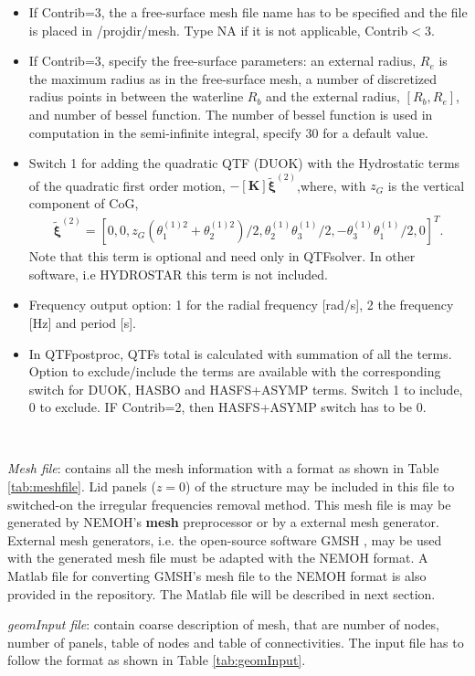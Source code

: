 \documentclass[12pt,a4paper,titlepage]{article}
\newcommand{\bs}{\boldsymbol}
\begin{document}
\begin{itemize}
\begin{itemize}
\item If Contrib=3, the a free-surface mesh file name has to be specified and the file is placed in /projdir/mesh. Type NA if it is not applicable, Contrib$<3$.
\item If Contrib=3, specify the free-surface parameters: an external radius, $R_e$ is the maximum radius as in the free-surface mesh, a number of discretized radius points in between the waterline $R_b$ and the external radius,  $[R_b,R_e]$, and number of bessel function. The number of bessel function is used in computation in the semi-infinite integral, specify 30 for  a default value.
\item Switch 1 for adding the quadratic QTF (DUOK) with the Hydrostatic terms of the quadratic  first order motion, $-[\bs K] \tilde{\bs \xi}^{(2)}$,where, with $z_G$ is the vertical component of CoG,
\begin{align*}
\tilde{\bs\xi}^{(2)}=[0,0,z_G(\theta_1^{(1)2}+\theta_2^{(1)2})/2,\theta_2^{(1)}\theta_3^{(1)}/2,-\theta_3^{(1)}\theta_1^{(1)}/2,0]^T.
\end{align*}
Note that this term is optional and need only in QTFsolver. In other software, i.e HYDROSTAR \cite{HYDROSTAR} this term is not included.
\item Frequency output option: 1 for the radial frequency [rad/s], 2 the frequency [Hz] and period [s].
\item In QTFpostproc, QTFs total is calculated with summation of all the terms. Option to exclude/include the terms are available with the corresponding switch for DUOK, HASBO and HASFS+ASYMP terms. Switch 1 to include, 0 to exclude. IF Contrib=2, then HASFS+ASYMP switch has to be 0.
\end{itemize}
\end{itemize}
\

\emph{Mesh file}: contains all the mesh information with a format as shown in Table \ref{tab:meshfile}. Lid panels ($z=0$) of the structure may be included in this file to switched-on the irregular frequencies removal method. This mesh file is may be generated by NEMOH's
\textbf{mesh} preprocessor or by a external mesh generator.
External mesh generators, i.e. the open-source software GMSH \cite{gmsh}, may be used with the generated mesh file must be adapted with the NEMOH format. A Matlab file for converting GMSH's mesh file to the NEMOH format is also provided in the repository. The Matlab file will be described in next section.

\emph{geomInput file}: contain coarse description of mesh, that are number of nodes, number of panels, table of nodes and table of connectivities. The input file has to follow the format as shown in Table \ref{tab:geomInput}.
\end{document}
